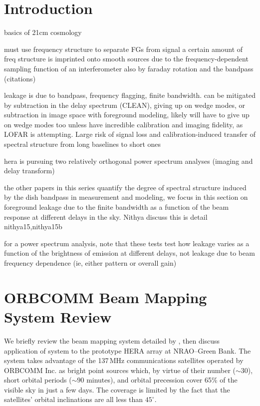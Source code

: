 \documentclass{emulateapj}
\begin{document}


\section{Introduction}

basics of 21cm cosmology

must use frequency structure to separate FGs from signal
a certain amount of freq structure is imprinted onto smooth sources due to the frequency-dependent sampling function of an interferometer
also by faraday rotation and the bandpass (citations)

leakage is due to bandpass, frequency flagging, finite bandwidth. can be mitigated by subtraction in the delay spectrum (CLEAN), giving up on wedge modes, or subtraction in image space with foreground modeling, likely will have to give up on wedge modes too unless have incredible calibration and imaging fidelity, as LOFAR is attempting. Large risk of signal loss and calibration-induced transfer of spectral structure from long baselines to short ones

hera is pursuing two relatively orthogonal power spectrum analyses (imaging and delay transform)

the other papers in this series quantify the degree of spectral structure induced by the dish bandpass in measurement and modeling, we focus in this section on foreground leakage due to the finite bandwidth as a function of the beam response at different delays in the sky. Nithya discuss this is detail nithya15,nithya15b

\citet{nithya15,nithya15b} 
for a power spectrum analysis, note that these tests test how leakage varies as a function of the brightness of emission at different delays, not leakage due to beam frequency dependence (ie, either pattern or overall gain)

\section{ORBCOMM Beam Mapping System Review}

We briefly review the beam mapping system detailed by \citet{neben15}, then discuss application of system to the prototype HERA array at NRAO--Green Bank. The system takes advantage of the 137\,MHz communications satellites operated by ORBCOMM Inc. as bright point sources which, by virtue of their number ($\sim30$), short orbital periods ($\sim90$ minutes), and orbital precession cover 65\% of the visible sky in just a few days. The coverage is limited by the fact that the satellites' orbital inclinations are all less than $45^\circ$. 
\end{document}
